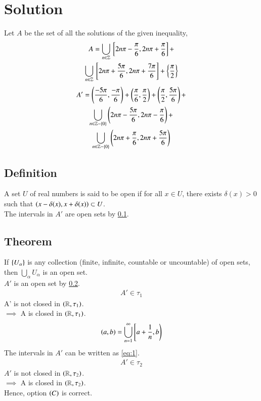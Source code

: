 \documentclass[journal,12pt,twocolumn]{IEEEtran}
\begin{document}
\section*{Solution}
Let $A$ be the set of all the solutions of the given inequality,
\begin{multline}
    A = \bigcup_{n \in \mathbb{Z}} {}\left[2n\pi - \frac{\pi}{6}, 2n\pi + \frac{\pi}{6}\right] +\\ \bigcup_{n \in \mathbb{Z}} {}\left[2n\pi + \frac{5\pi}{6}, 2n\pi + \frac{7\pi}{6}\right] + \left\{\frac{\pi}{2}\right\}
\end{multline}
\begin{multline}
    A' = \left(\frac{-5\pi}{6},\frac{-\pi}{6}\right) + \left(\frac{\pi}{6}, \frac{\pi}{2}\right) + \left(\frac{\pi}{2}, \frac{5\pi}{6}\right) + \\ \bigcup_{n \in \mathbb{Z} - \left\{0\right\}} \left(2n\pi - \frac{5\pi}{6}, 2n\pi - \frac{\pi}{6}\right) +\\ \bigcup_{n \in \mathbb{Z} - \left\{0\right\}} \left(2n\pi + \frac{\pi}{6}, 2n\pi + \frac{5\pi}{6}\right)
\end{multline}
\subsection{Definition}
\label{sec:def1}
A set $U$ of real numbers is said to be open if for all $x \in U$, there exists $\delta(x) > 0$ such that $\left(x - \delta(x), x + \delta(x)\right) \subset U$.\\
The intervals in $A'$ are open sets by \ref{sec:def1}.
\subsection{Theorem}
\label{sec:thrm1}
If $\left\{U_{\alpha}\right\}$ is any collection (finite, infinite, countable or uncountable) of open sets, then $\bigcup_{\alpha}U_{\alpha}$ is an open set.\\
$A'$ is an open set by \ref{sec:thrm1}.
\begin{align}
    A' \in \tau_1
\end{align}
A' is not closed in $\left(\mathbb{R}, \tau_1\right)$.\\
$\implies$ A is closed in $\left(\mathbb{R}, \tau_1\right)$.
\begin{align}
    \left(a,b\right) = \bigcup_{n = 1}^{\infty}\left[a + \frac{1}{n}, b\right)\label{eq:1}
\end{align}
The intervals in $A'$ can be written as \eqref{eq:1}.
\begin{align}
    A' \in \tau_2
\end{align}
$A'$ is not closed in $\left(\mathbb{R}, \tau_2\right)$.\\
$\implies$ A is closed in $\left(\mathbb{R}, \tau_2\right)$.\\
Hence, option $\left(C\right)$ is correct.
\end{document}
